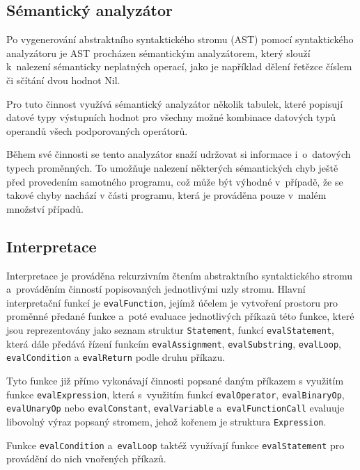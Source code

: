 \documentclass[12pt,a4paper,titlepage,final]{article}
\begin{document}
\subsection{Sémantický analyzátor}
Po vygenerování abstraktního syntaktického stromu (AST) pomocí syntaktického analyzátoru 
je AST procházen sémantickým analyzátorem, který slouží k~nalezení sémanticky 
neplatných operací, jako je například dělení řetězce číslem či sčítání dvou hodnot Nil.

Pro tuto činnost využívá sémantický analyzátor několik tabulek, které 
popisují datové typy výstupních hodnot pro všechny možné kombinace 
datových typů operandů všech podporovaných operátorů. 

Během své činnosti se tento analyzátor snaží udržovat si informace 
i~o~datových typech proměnných. To umožňuje nalezení některých sémantických 
chyb ještě před provedením samotného programu, což může být výhodné 
v~případě, že se takové chyby nachází v části programu, která je prováděna 
pouze v~malém množství případů.
\subsection{Interpretace}
Interpretace je prováděna rekurzivním čtením abstraktního syntaktického stromu 
a~prováděním činností popisovaných jednotlivými uzly stromu. 
Hlavní interpretační funkcí je \texttt{evalFunction}, jejímž účelem je 
vytvoření prostoru pro proměnné předané funkce a~poté evaluace jednotlivých 
příkazů této funkce, které jsou reprezentovány jako seznam struktur \texttt{Statement}, 
funkcí \texttt{evalStatement}, která dále předává řízení funkcím 
\texttt{evalAssignment}, \texttt{evalSubstring}, \texttt{evalLoop}, 
\texttt{evalCondition} a \texttt{evalReturn} podle druhu příkazu. 

Tyto funkce již přímo vykonávají činnosti popsané daným příkazem 
s využitím funkce \texttt{evalExpression}, která s~využitím funkcí \texttt{evalOperator}, 
\texttt{evalBinaryOp}, \texttt{evalUnaryOp} nebo \texttt{evalConstant}, \texttt{evalVariable} 
a~\texttt{evalFunctionCall} evaluuje libovolný výraz popsaný stromem, 
jehož kořenem je struktura \texttt{Expression}. 

Funkce \texttt{evalCondition} a~\texttt{evalLoop} taktéž využívají funkce 
\texttt{evalStatement} pro provádění do nich vnořených příkazů.

\end{document}
